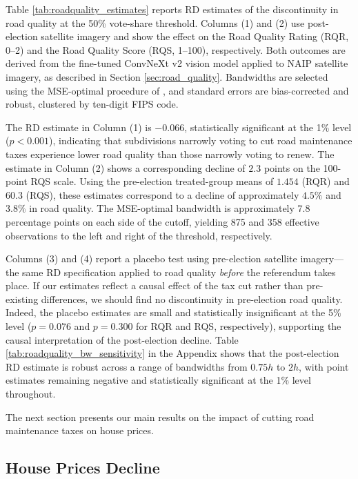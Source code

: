 Table \ref{tab:roadquality_estimates} reports RD estimates of the discontinuity in road quality at the 50\% vote-share threshold. Columns (1) and (2) use post-election satellite imagery and show the effect on the Road Quality Rating (RQR, 0--2) and the Road Quality Score (RQS, 1--100), respectively. Both outcomes are derived from the fine-tuned ConvNeXt v2 vision model applied to NAIP satellite imagery, as described in Section \ref{sec:road_quality}. Bandwidths are selected using the MSE-optimal procedure of \cite{calonico2019regression}, and standard errors are bias-corrected and robust, clustered by ten-digit FIPS code.

The RD estimate in Column (1) is $-0.066$, statistically significant at the 1\% level ($p < 0.001$), indicating that subdivisions narrowly voting to cut road maintenance taxes experience lower road quality than those narrowly voting to renew. The estimate in Column (2) shows a corresponding decline of $2.3$ points on the 100-point RQS scale. Using the pre-election treated-group means of $1.454$ (RQR) and $60.3$ (RQS), these estimates correspond to a decline of approximately $4.5\%$ and $3.8\%$ in road quality. The MSE-optimal bandwidth is approximately 7.8 percentage points on each side of the cutoff, yielding 875 and 358 effective observations to the left and right of the threshold, respectively.

Columns (3) and (4) report a placebo test using pre-election satellite imagery---the same RD specification applied to road quality \textit{before} the referendum takes place. If our estimates reflect a causal effect of the tax cut rather than pre-existing differences, we should find no discontinuity in pre-election road quality. Indeed, the placebo estimates are small and statistically insignificant at the 5\% level ($p = 0.076$ and $p = 0.300$ for RQR and RQS, respectively), supporting the causal interpretation of the post-election decline. Table \ref{tab:roadquality_bw_sensitivity} in the Appendix shows that the post-election RD estimate is robust across a range of bandwidths from $0.75h$ to $2h$, with point estimates remaining negative and statistically significant at the 1\% level throughout.

The next section presents our main results on the impact of cutting road maintenance taxes on house prices.

\subsection{House Prices Decline}

